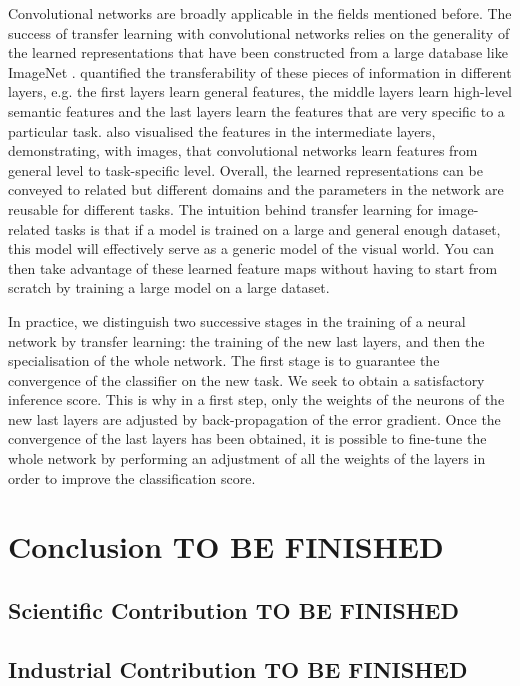 Convolutional networks are broadly applicable in the fields mentioned before. The success of transfer learning with convolutional networks relies on the generality of the learned representations that have been constructed from a large database like ImageNet \citep{deng2009imagenet}. \citep{yosinski2014transferable} quantified the transferability of these pieces of information in different layers, e.g. the first layers learn general features, the middle layers learn high-level semantic features and the last layers learn the features that are very specific to a particular task. \citep{zeiler2014visualizing} also visualised the features in the intermediate layers, demonstrating, with images, that convolutional networks learn features from general level to task-specific level. Overall, the learned representations can be conveyed to related but different domains and the parameters in the network are reusable for different tasks. The intuition behind transfer learning for image-related tasks is that if a model is trained on a large and general enough dataset, this model will effectively serve as a generic model of the visual world. You can then take advantage of these learned feature maps without having to start from scratch by training a large model on a large dataset.

In practice, we distinguish two successive stages in the training of a neural network by transfer learning: the training of the new last layers, and then the specialisation of the whole network. The first stage is to guarantee the convergence of the classifier on the new task. We seek to obtain a satisfactory inference score. This is why in a first step, only the weights of the neurons of the new last layers are adjusted by back-propagation of the error gradient. Once the convergence of the last layers has been obtained, it is possible to fine-tune the whole network by performing an adjustment of all the weights of the layers in order to improve the classiﬁcation score.


\section{Conclusion TO BE FINISHED}


\subsection{Scientific Contribution TO BE FINISHED}

\subsection{Industrial Contribution TO BE FINISHED}


